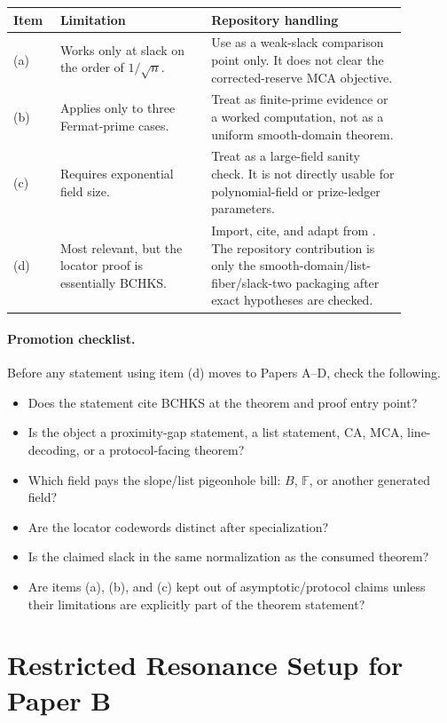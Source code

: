 \documentclass[11pt]{article}
\newcommand{\F}{\mathbb F}
\begin{document}
\begin{center}
\begin{tabular}{p{0.10\linewidth}p{0.34\linewidth}p{0.44\linewidth}}
\textbf{Item} & \textbf{Limitation} & \textbf{Repository handling}\\
\hline
(a) & Works only at slack on the order of \(1/\sqrt n\). & Use as a weak-slack comparison point only.  It does not clear the corrected-reserve MCA objective.\\
(b) & Applies only to three Fermat-prime cases. & Treat as finite-prime evidence or a worked computation, not as a uniform smooth-domain theorem.\\
(c) & Requires exponential field size. & Treat as a large-field sanity check.  It is not directly usable for polynomial-field or prize-ledger parameters.\\
(d) & Most relevant, but the locator proof is essentially BCHKS. & Import, cite, and adapt from \cite[Thm.~7.1 and Thm.~1.13]{BCHKS25}.  The repository contribution is only the smooth-domain/list-fiber/slack-two packaging after exact hypotheses are checked.\\
\end{tabular}
\end{center}

\paragraph{Promotion checklist.}
Before any statement using item (d) moves to Papers A--D, check the following.
\begin{itemize}
\item Does the statement cite BCHKS at the theorem and proof entry point?
\item Is the object a proximity-gap statement, a list statement, CA, MCA,
  line-decoding, or a protocol-facing theorem?
\item Which field pays the slope/list pigeonhole bill: \(B\), \(\F\), or
  another generated field?
\item Are the locator codewords distinct after specialization?
\item Is the claimed slack in the same normalization as the consumed theorem?
\item Are items (a), (b), and (c) kept out of asymptotic/protocol claims unless
  their limitations are explicitly part of the theorem statement?
\end{itemize}

\section{Restricted Resonance Setup for Paper B}
\label{sec:resonance-setup}
\end{document}

